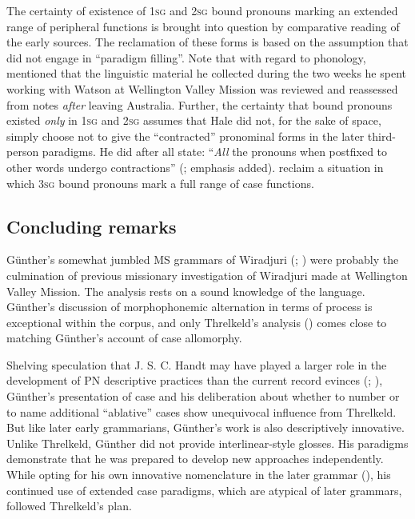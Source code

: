 The certainty of existence of 1\textsc{sg} and 2\textsc{sg} bound pronouns marking an extended range of peripheral functions \citep[345]{dixon_australian_2002} is brought into question by comparative reading of the early sources. The reclamation of these forms is based on the assumption that \citet[488--489]{hale_languages_1846} did not engage in ``paradigm filling''. Note that with regard to phonology, \citet[493]{hale_languages_1846} mentioned that the linguistic material he collected during the two weeks he spent working with Watson at Wellington Valley Mission was reviewed and reassessed from notes \textit{after} leaving Australia. Further, the certainty that bound pronouns existed \textit{only} in 1\textsc{sg} and 2\textsc{sg} assumes that Hale did not, for the sake of space, simply choose not to give the “contracted” pronominal forms in the later third-person paradigms. He did after all state: ``\textit{All} the pronouns when postfixed to other words undergo contractions'' (\citealt[483]{hale_languages_1846}; emphasis added). \citet[28--38]{grant_wiradjuri_2001} reclaim a situation in which 3\textsc{sg} bound pronouns mark a full range of case functions.

\subsection{Concluding remarks}
\label{sec:key:4.4.7}

Günther’s somewhat jumbled MS grammars of Wiradjuri (\citeyear{gunther_native_1838}; \citeyear{gunther_lecture_1840}) were probably the culmination of previous missionary investigation of Wiradjuri made at Wellington Valley Mission. The analysis rests on a sound knowledge of the language. Günther’s discussion of morphophonemic alternation in terms of process is exceptional within the corpus, and only Threlkeld’s analysis (\citeyear{threlkeld_australian_1834}) comes close to matching Günther’s account of case allomorphy. 

Shelving speculation that J. S. C. Handt may have played a larger role in the development of PN descriptive practices than the current record evinces (; ), Günther’s presentation of case and his deliberation about whether to number or to name additional “ablative” cases show unequivocal influence from Threlkeld. But like later early grammarians, Günther’s work is also descriptively innovative. Unlike Threlkeld, Günther did not provide interlinear-style glosses. His paradigms demonstrate that he was prepared to develop new approaches independently. While opting for his own innovative nomenclature in the later grammar (\citeyear{gunther_lecture_1840}), his continued use of extended case paradigms, which are atypical of later grammars, followed Threlkeld’s plan.

